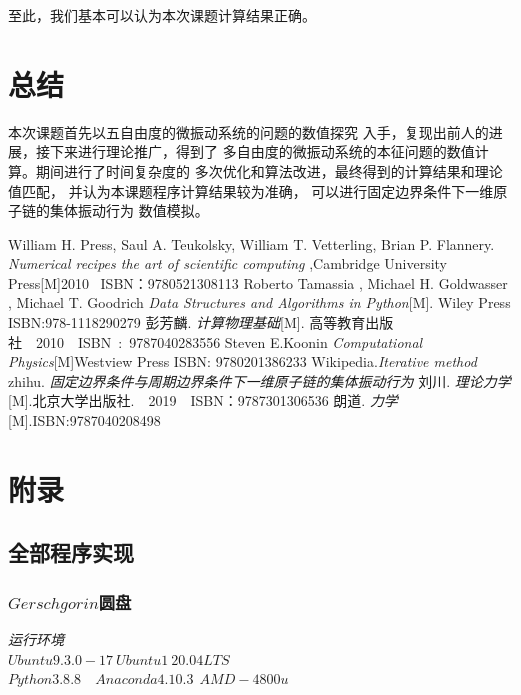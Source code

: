 \documentclass[11pt, a4paper, oneside]{ctexart}
\begin{document}
{{{至此，我们基本可以认为本次课题计算结果正确。
\newpage
\section{总结}
本次课题首先以五自由度的微振动系统的问题的数值探究
入手，复现出前人的进展，接下来进行理论推广，得到了
多自由度的微振动系统的本征问题的数值计算。期间进行了时间复杂度的
多次优化和算法改进，最终得到的计算结果和理论值匹配，
并认为本课题程序计算结果较为准确，
可以进行固定边界条件下一维原子链的集体振动行为
数值模拟。





\newpage

\begin{thebibliography}{99}
    William H. Press, Saul A. Teukolsky, William T. Vetterling, Brian P. Flannery. \emph{Numerical recipes the art of scientific computing },Cambridge University Press[M]2010 \ ISBN：9780521308113
     Roberto Tamassia , Michael H. Goldwasser , Michael T. Goodrich  \emph{Data Structures and Algorithms in Python}[M]. Wiley Press ISBN:978-1118290279
    彭芳麟. \emph{计算物理基础}[M]. 高等教育出版社\ \ 2010\ \ ISBN\ :\ 9787040283556 
    Steven E.Koonin \emph{Computational Physics}[M]Westview Press ISBN: 9780201386233 
    Wikipedia.\emph{Iterative method}
    zhihu. \emph{固定边界条件与周期边界条件下一维原子链的集体振动行为}
    刘川. \emph{理论力学}[M].北京大学出版社.\ \ 2019\ \ ISBN：9787301306536
    朗道. \emph{力学}[M].ISBN:9787040208498
\end{thebibliography}

\newpage
\section{附录}
\begin{appendices}
    \renewcommand{\thesection}{\Alph{section}}
    \subsection{全部程序实现}
    \subsubsection{$Gerschgorin$圆盘}
        {    \begin{flushright}
    \scriptsize\emph{运行环境\\$Ubuntu 9.3.0-17\ Ubuntu1~20.04LTS$}\\
    \scriptsize\emph{$Python 3.8.8$\ \ $Anaconda 4.10.3\ \  AMD-4800u$}
        

\end{flushright}}
\end{appendices}}}}
\end{document}
